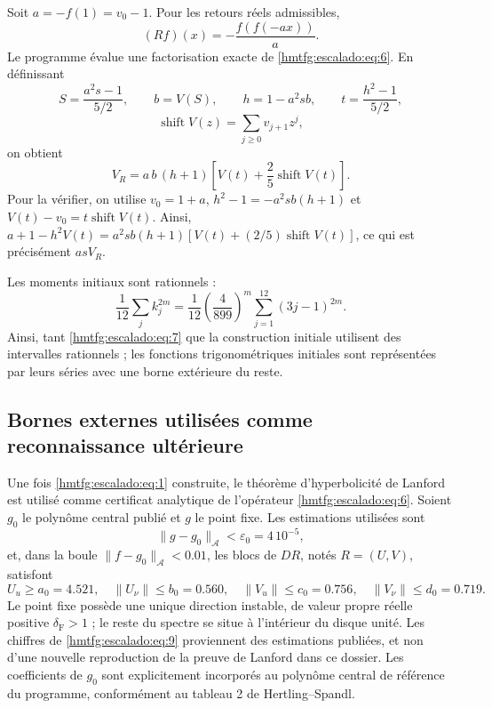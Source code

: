 Soit \(a=-f(1)=v_0-1\). Pour les retours réels admissibles,
\begin{equation}
(Rf)(x)=-\frac{f(f(-ax))}{a}.
\label{hmtfg:escalado:eq:6}
\end{equation}
Le programme évalue une factorisation exacte de \eqref{hmtfg:escalado:eq:6}. En définissant
\[
S=\frac{a^2s-1}{5/2},\qquad b=V(S),\qquad
h=1-a^2sb,\qquad t=\frac{h^2-1}{5/2},
\]
\[
\operatorname{shift}V(z)=\sum_{j\ge0}v_{j+1}z^j,
\]
on obtient
\begin{equation}
\boxed{V_R=a\,b\,(h+1)\left[V(t)+\frac25\operatorname{shift}V(t)\right].}
\label{hmtfg:escalado:eq:7}
\end{equation}
Pour la vérifier, on utilise \(v_0=1+a\),
\(h^2-1=-a^2sb(h+1)\) et
\(V(t)-v_0=t\operatorname{shift}V(t)\). Ainsi,
\(a+1-h^2V(t)=a^2sb(h+1)[V(t)+(2/5)\operatorname{shift}V(t)]\),
ce qui est précisément \(asV_R\).

Les moments initiaux sont rationnels :
\begin{equation}
\frac1{12}\sum_jk_j^{2m}
=\frac1{12}\left(\frac4{899}\right)^m
\sum_{j=1}^{12}(3j-1)^{2m}.
\label{hmtfg:escalado:eq:8}
\end{equation}
Ainsi, tant \eqref{hmtfg:escalado:eq:7} que la construction initiale utilisent des intervalles rationnels ; les fonctions trigonométriques initiales sont représentées par leurs séries avec une borne extérieure du reste.


\subsection{Bornes externes utilisées comme reconnaissance ultérieure}
\label{hmtfg:escalado:3}

Une fois \eqref{hmtfg:escalado:eq:1} construite, le théorème d’hyperbolicité de Lanford est utilisé comme certificat analytique de l’opérateur \eqref{hmtfg:escalado:eq:6}. Soient \(g_0\) le polynôme central publié et \(g\) le point fixe. Les estimations utilisées sont
\[
\|g-g_0\|_{\mathcal A}<\varepsilon_0=4\,10^{-5},
\]
et, dans la boule \(\|f-g_0\|_{\mathcal A}<0.01\), les blocs de \(DR\), notés \(R=(U,V)\), satisfont
\begin{equation}
U_u\ge a_0=4.521,\quad
\|U_\nu\|\le b_0=0.560,\quad
\|V_u\|\le c_0=0.756,\quad
\|V_\nu\|\le d_0=0.719.
\label{hmtfg:escalado:eq:9}
\end{equation}
Le point fixe possède une unique direction instable, de valeur propre réelle positive \(\delta_{\mathrm F}>1\) ; le reste du spectre se situe à l’intérieur du disque unité. Les chiffres de \eqref{hmtfg:escalado:eq:9} proviennent des estimations publiées, et non d’une nouvelle reproduction de la preuve de Lanford dans ce dossier. Les coefficients de \(g_0\) sont explicitement incorporés au polynôme central de référence du programme, conformément au tableau 2 de Hertling–Spandl.

